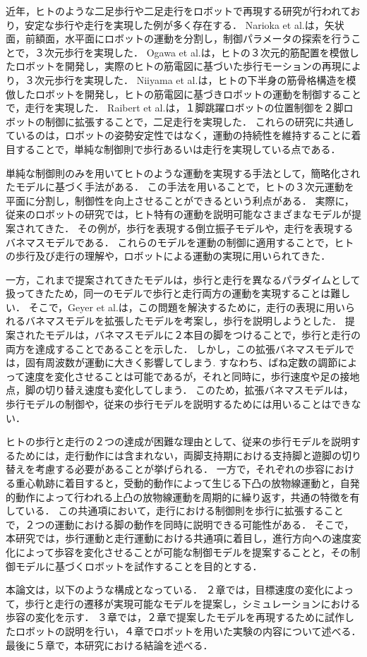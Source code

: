 近年，ヒトのような二足歩行や二足走行をロボットで再現する研究が行われており，安定な歩行や走行を実現した例が多く存在する．
Narioka et al.は，矢状面，前額面，水平面にロボットの運動を分割し，制御パラメータの探索を行うことで，３次元歩行を実現した\cite{pneumatbt}． %
Ogawa et al.は，ヒトの３次元的筋配置を模倣したロボットを開発し，実際のヒトの筋電図に基づいた歩行モーションの再現により，３次元歩行を実現した\cite{pneumatbs}． %
Niiyama et al.は，ヒトの下半身の筋骨格構造を模倣したロボットを開発し，ヒトの筋電図に基づきロボットの運動を制御することで，走行を実現した\cite{athleterobot}． %
Raibert et al.は，１脚跳躍ロボットの位置制御を２脚ロボットの制御に拡張することで，二足走行を実現した\cite{Raibert:2000:LRB:518526}． %
これらの研究に共通しているのは，ロボットの姿勢安定性ではなく，運動の持続性を維持することに着目することで，単純な制御則で歩行あるいは走行を実現している点である．

単純な制御則のみを用いてヒトのような運動を実現する手法として，簡略化されたモデルに基づく手法がある．
この手法を用いることで，ヒトの３次元運動を平面に分割し，制御性を向上させることができるという利点がある．
実際に，従来のロボットの研究では，ヒト特有の運動を説明可能なさまざまなモデルが提案されてきた．
その例が，歩行を表現する倒立振子モデル\cite{McGeer:1990:PDW:83528.83533,mobl,doi:10.1152/ajpregu.1977.233.5.R243}や，走行を表現するバネマスモデル\cite{BLICKHAN19891217,doi:10.1098/rspb.2006.3637}である．
これらのモデルを運動の制御に適用することで，ヒトの歩行及び走行の理解や，ロボットによる運動の実現に用いられてきた\cite{doi:10.1163/156855303321165097,893174,Seyfarth2547}．

一方，これまで提案されてきたモデルは，歩行と走行を異なるパラダイムとして扱ってきたため，同一のモデルで歩行と走行両方の運動を実現することは難しい．
そこで，Geyer et al.は，この問題を解決するために，走行の表現に用いられるバネマスモデルを拡張したモデルを考案し，歩行を説明しようとした\cite{doi:10.1098/rspb.2006.3637}．
提案されたモデルは，バネマスモデルに２本目の脚をつけることで，歩行と走行の両方を達成することであることを示した．
しかし，この拡張バネマスモデルでは，固有周波数が運動に大きく影響してしまう.
すなわち、ばね定数の調節によって速度を変化させることは可能であるが，それと同時に，歩行速度や足の接地点，脚の切り替え速度も変化してしまう．
このため，拡張バネマスモデルは，歩行モデルの制御や，従来の歩行モデルを説明するためには用いることはできない．

ヒトの歩行と走行の２つの達成が困難な理由として、従来の歩行モデルを説明するためには，走行動作には含まれない，両脚支持期における支持脚と遊脚の切り替えを考慮する必要があることが挙げられる．
一方で，それぞれの歩容における重心軌跡に着目すると，受動的動作によって生じる下凸の放物線運動と，自発的動作によって行われる上凸の放物線運動を周期的に繰り返す，共通の特徴を有している．
この共通項において，走行における制御則を歩行に拡張することで，２つの運動における脚の動作を同時に説明できる可能性がある．
そこで，本研究では，歩行運動と走行運動における共通項に着目し，進行方向への速度変化によって歩容を変化させることが可能な制御モデルを提案することと，その制御モデルに基づくロボットを試作することを目的とする．

本論文は，以下のような構成となっている．
２章では，目標速度の変化によって，歩行と走行の遷移が実現可能なモデルを提案し，シミュレーションにおける歩容の変化を示す．
３章では，２章で提案したモデルを再現するために試作したロボットの説明を行い，４章でロボットを用いた実験の内容について述べる．
最後に５章で，本研究における結論を述べる．